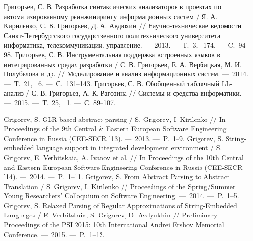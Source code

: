 \begin{thebibliography}{99}

 Григорьев, С. В. Разработка синтаксических анализаторов в проектах по автоматизированному реинжинирингу информационных систем / Я. А. Кириленко, С. В. Григорьев, Д. А. Авдюхин // Научно-технические ведомости Санкт-Петербургского государственного политехнического университета информатика, телекоммуникации, управление. ---~2013. ---~Т.~3, \textnumero~174. ---~C.~94--98.
 Григорьев, С. В. Инструментальная поддержка встроенных языков в интегрированных средах разработки / С. В. Григорьев, Е. А. Вербицкая, М. И. Полубелова и др. // Моделирование и анализ информационных систем. ---~2014. ---~Т.~21, \textnumero~6.  ---~С.~131--143.
 Григорьев, С. В. Обобщенный табличный LL-анализ / С. В. Григорьев, А. К. Рагозина // Системы и средства информатики. ---~2015. ---~Т.~25, \textnumero~1.  ---~С. 89--107. 

 Grigorev, S. GLR-based abstract parsing / S. Grigorev, I. Kirilenko // In Proceedings of the 9th Central \& Eastern European Software Engineering Conference in Russia (CEE-SECR ’13). ---~2013. ---~P.~1--9.
 Grigorev, S. String-embedded language support in integrated development environment / S. Grigorev, E. Verbitskaia, A. Ivanov et al. // In Proceedings of the 10th Central and Eastern European Software Engineering Conference in Russia (CEE-SECR '14). ---~2014. ---~P.~1--11.
 Grigorev, S. From Abstract Parsing to Abstract Translation / S. Grigorev, I. Kirilenko // Proceedings of the Spring/Summer Young Researchers' Colloquium on Software Engineering. ---~2014. ---~P.~1--5.
 Grigorev, S. Relaxed Parsing of Regular Approximations of String-Embedded Languages / E. Verbitskaia, S. Grigorev, D. Avdyukhin // Preliminary Proceedings of the PSI 2015: 10th International Andrei Ershov Memorial Conference. ---~2015. ---~P.~1--12.

\end{thebibliography}
